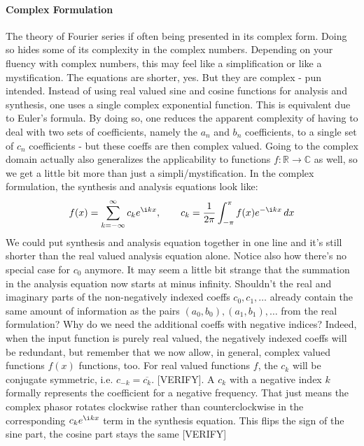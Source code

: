 \paragraph{Complex Formulation}
The theory of Fourier series if often being presented in its complex form. Doing so hides some of its complexity in the complex numbers. Depending on your fluency with complex numbers, this may feel like a simplification or like a mystification. The equations are shorter, yes. But they are complex - pun intended. Instead of using real valued sine and cosine functions for analysis and synthesis, one uses a single complex exponential function. This is equivalent due to Euler's formula. By doing so, one reduces the apparent complexity of having to deal with two sets of coefficients, namely the $a_n$ and $b_n$ coefficients, to a single set of $c_n$ coefficients - but these coeffs are then complex valued. Going to the complex domain actually also generalizes the applicability to functions $f: \mathbb{R} \rightarrow \mathbb{C}$ as well, so we get a little bit more than just a simpli/mystification. In the complex formulation, the synthesis and analysis equations look like:
\begin{equation}
\label{Eq:FourierSeriesComplex}
 f(x) = \sum_{k=-\infty}^\infty c_k  e^{\i k x}, \qquad
 c_k = \frac{1}{2\pi} \int_{-\pi}^{\pi} f(x) e^{-\i k x}  \, dx
\end{equation}
We could put synthesis and analysis equation together in one line and it's still shorter than the real valued analysis equation alone. Notice also how there's no special case for $c_0$ anymore. It may seem a little bit strange that the summation in the analysis equation now starts at minus infinity. Shouldn't the real and imaginary parts of the non-negatively indexed coeffs $c_0, c_1, \ldots$ already contain the same amount of information as the pairs $(a_0,b_0),(a_1,b_1), \ldots$ from the real formulation? Why do we need the additional coeffs with negative indices? Indeed, when the input function is purely real valued, the negatively indexed coeffs will be redundant, but remember that we now allow, in general, complex valued functions $f(x)$ functions, too. For real valued functions $f$, the $c_k$ will be conjugate symmetric, i.e. $c_{-k} = \overline{c_k}$. [VERIFY]. A $c_k$ with a negative index $k$ formally represents the coefficient for a negative frequency. That just means the complex phasor rotates clockwise rather than counterclockwise in the corresponding $c_k  e^{\i k x}$ term in the synthesis equation. This flips the sign of the sine part, the cosine part stays the same [VERIFY]

